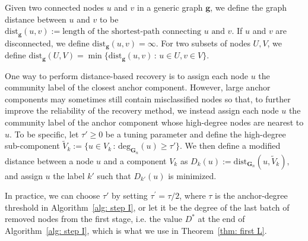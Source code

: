 \documentclass[twoside,11pt]{article}
\newtheorem{defin}[theorem]{Definition}
\theoremstyle{remark}
\begin{document}
Given two connected nodes $u$ and $v$ in a generic graph $\bm{g}$, we define the graph distance between $u$ and $v$ to be
$\mathrm{dist}_{\bm{g}}(u, v) := \text{length of the shortest-path connecting $u$ and $v$}.$ If $u$ and $v$ are disconnected, we define $\mathrm{dist}_{\bm{g}}(u,v) = \infty$. For two subsets of nodes $U, V$, we define $\mathrm{dist}_{\bm{g}}(U, V) = \min \{ \mathrm{dist}_{\bm{g}}(u, v) \,:\, u \in U, v \in V \}$.


One way to perform distance-based recovery is to assign each node $u$ the community label of the closest anchor component. However, large anchor components may sometimes still contain misclassified nodes so that, to further improve the reliability of the recovery method, we instead assign each node $u$ the community label of the anchor component whose high-degree nodes are nearest to $u$. To be specific, let $\tau'\geq0$ be a tuning parameter and define the high-degree sub-component $\tilde{V}_k := \{ u \in V_k \,:\, \text{deg}_{\bm{G}_n}(u) \geq \tau' \}$. We then define a modified distance between a node $u$ and a component $V_k$ as $D_k(u) := \text{dist}_{\bm{G}_n}(u, \tilde{V}_k),$
and assign $u$ the label $k'$ such that $D_{k'}(u)$ is minimized. 

In practice, we can choose $\tau'$ by setting $\tau^\prime=\tau/2$, where $\tau$ is the anchor-degree threshold in Algorithm~\ref{alg: step I}, or let it be the degree of the last batch of removed nodes from the first stage, i.e. the value $D^*$ at the end of Algorithm~\ref{alg: step I}, which is what we use in Theorem~\ref{thm: first L}. 
\end{document}
